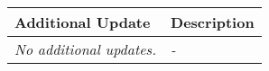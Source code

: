 \begin{table}[!h]
    \centering
    \begin{tabularx}{\textwidth}{|l|X|}
        \hline
        Additional Update & Description \\
        \hline
        \hline
        \textit{No additional updates.} & 
        \textit{-}\\
        \hline
    \end{tabularx}
\end{table}
